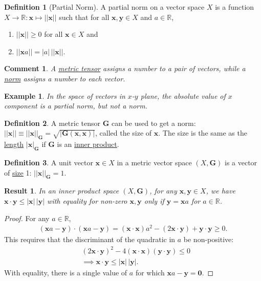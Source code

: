 \documentclass[letterpaper,12pt]{article}
\theoremstyle{plain}
\newtheorem{res}{Result}
\theoremstyle{plain}
\newtheorem{exmp}{Example}
\newtheorem*{cmnt*}{Comment}
\theoremstyle{definition}
\newtheorem{defn}{Definition}
\begin{document}
\begin{defn}[Partial Norm]\label{defpnorm}
A partial norm on a vector space $X$ is a function $X\rightarrow \mathbb{R}: \mathbf{x} \mapsto ||\mathbf{x}||$ such that for all $\mathbf{x},\mathbf{y} \in X$ and $a \in \mathbb{R}$,
\begin{enumerate}
\item $||\mathbf{x}|| \ge 0$ for all $\mathbf{x} \in X$ and
\item $||\mathbf{x}a||=|a|\,||\mathbf{x}||$.
\end{enumerate}
\end{defn}

\begin{cmnt*}
A \hyperref[defmettns]{metric tensor} assigns a number to a pair of vectors, while a \hyperref[defnorm]{norm} assigns a number to each vector.
\end{cmnt*}

\begin{exmp}
In the space of vectors in $x$-$y$ plane, the absolute value of $x$ component is a partial norm, but not a norm.  
\end{exmp}

\begin{defn}\label{defsize}
A metric tensor $\mathbf{G}$ can be used to get a norm: $||\mathbf{x}|| \equiv ||\mathbf{x}||_\mathbf{G} = \sqrt{|\mathbf{G}(\mathbf{x},\mathbf{x})|}$, called the size of $\mathbf{x}$. The size is the same as the \hyperref[deflen]{length} $|\mathbf{x}|_\mathbf{G}$ if $\mathbf{G}$ is an \hyperref[definnpdt]{inner product}.
\end{defn}

\begin{defn}\label{defunit}
A unit vector $\mathbf{x}\in X$ in a metric vector space $(X,\mathbf{G})$ is a vector of \hyperref[defsize]{size} 1: $||\mathbf{x}||_\mathbf{G}=1$.
\end{defn}

\begin{res}In an inner product space $(X,\mathbf{G})$, for any $\mathbf{x},\mathbf{y} \in X$, we have $\mathbf{x}\cdot\mathbf{y} \le |\mathbf{x}|\,|\mathbf{y}|$ with equality for non-zero $\mathbf{x},\mathbf{y}$ only if $\mathbf{y}=\mathbf{x}a$ for $a \in \mathbb{R}$.
\end{res}
\begin{proof}
For any $a\in \mathbb{R}$,
\begin{align*}
(\mathbf{x}a-\mathbf{y})\cdot(\mathbf{x}a-\mathbf{y}) = (\mathbf{x}\cdot\mathbf{x})a^2 - (2\mathbf{x}\cdot\mathbf{y}) + \mathbf{y}\cdot\mathbf{y} \ge 0.
\end{align*}
This requires that the discriminant of the quadratic in $a$ be non-positive:
\begin{align*}
&(2\mathbf{x}\cdot\mathbf{y})^2 - 4(\mathbf{x}\cdot\mathbf{x})(\mathbf{y}\cdot\mathbf{y}) \le 0\\
&\implies \mathbf{x}\cdot\mathbf{y} \le |\mathbf{x}|\,|\mathbf{y}|.
\end{align*}
With equality, there is a single value of $a$ for which $\mathbf{x}a-\mathbf{y} = \mathbf{0}$.
\end{proof}
\end{document}
